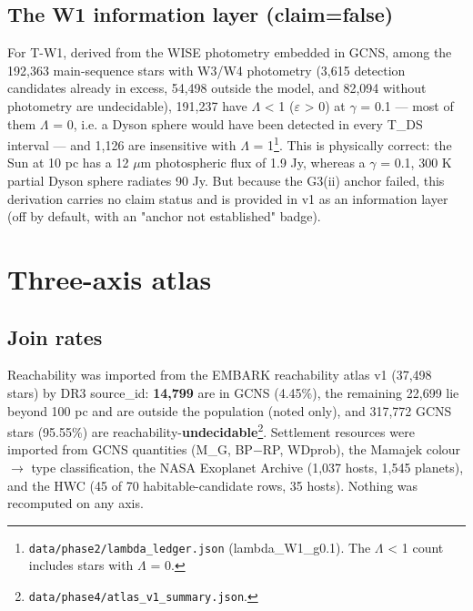 \documentclass{aa}
\begin{document}
\subsection{The W1 information layer (claim=false)}
\noindent For T-W1, derived from the WISE photometry embedded in GCNS, among the 192,363 main-sequence stars with W3/W4 photometry (3,615 detection candidates already in excess, 54,498 outside the model, and 82,094 without photometry are undecidable), 191,237 have \(\Lambda\) < 1 (\(\varepsilon\) > 0) at \(\gamma\) = 0.1 --- most of them \(\Lambda\) = 0, i.e. a Dyson sphere would have been detected in every T\_DS interval --- and 1,126 are insensitive with \(\Lambda\) = 1\footnote{\texttt{data/phase2/lambda\_ledger.json} (lambda\_W1\_g0.1). The \(\Lambda\) < 1 count includes stars with \(\Lambda\) = 0.}. This is physically correct: the Sun at 10 pc has a 12 \(\mu\)m photospheric flux of 1.9 Jy, whereas a \(\gamma\) = 0.1, 300 K partial Dyson sphere radiates 90 Jy. But because the G3(ii) anchor failed, this derivation carries no claim status and is provided in v1 as an information layer (off by default, with an "anchor not established" badge).\par\smallskip


\section{Three-axis atlas}

\subsection{Join rates}
\noindent Reachability was imported from the EMBARK reachability atlas v1 (37,498 stars) by DR3 source\_id: \textbf{14,799} are in GCNS (4.45\%), the remaining 22,699 lie beyond 100 pc and are outside the population (noted only), and 317,772 GCNS stars (95.55\%) are reachability-\textbf{undecidable}\footnote{\texttt{data/phase4/atlas\_v1\_summary.json}.}. Settlement resources were imported from GCNS quantities (M\_G, BP\(-\)RP, WDprob), the Mamajek colour \(\rightarrow\) type classification, the NASA Exoplanet Archive (1,037 hosts, 1,545 planets), and the HWC (45 of 70 habitable-candidate rows, 35 hosts). Nothing was recomputed on any axis.\par\smallskip
\end{document}
